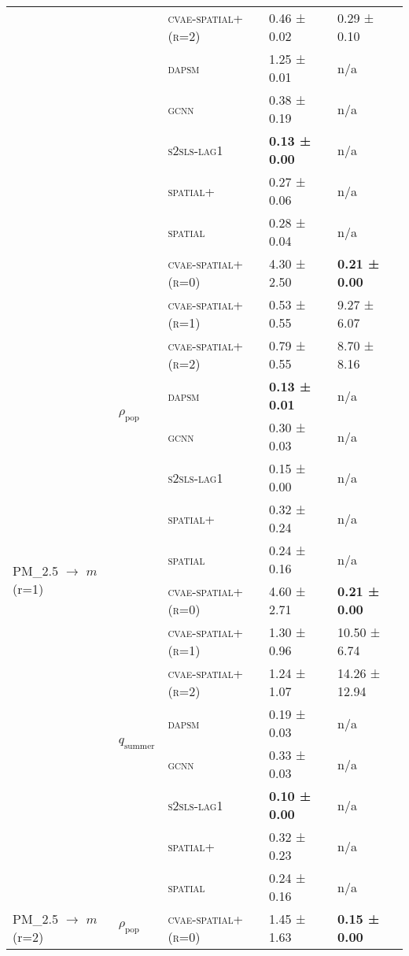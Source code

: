 \documentclass{article}
\begin{document}
\begin{table}[!tbp]
\begin{tabular}{lllll}
 &  & \textsc{cvae-spatial+ (r=2)} & 0.46 ± {\small 0.02} & 0.29 ± {\small 0.10} \\
 &  & \textsc{dapsm} & 1.25 ± {\small 0.01} & n/a \\
 &  & \textsc{gcnn} & 0.38 ± {\small 0.19} & n/a \\
 &  & \textsc{s2sls-lag1} & \bf 0.13 ± {\small 0.00} & n/a \\
 &  & \textsc{spatial+} & 0.27 ± {\small 0.06} & n/a \\
 &  & \textsc{spatial} & 0.28 ± {\small 0.04} & n/a \\
\cline{1-5} \cline{2-5}
\multirow[t]{16}{*}{PM_{2.5} $\to$ $m$ (r=1)} & \multirow[t]{8}{*}{$\rho_{\text{pop}}$} & \textsc{cvae-spatial+ (r=0)} & 4.30 ± {\small 2.50} & \bf 0.21 ± {\small 0.00} \\
 &  & \textsc{cvae-spatial+ (r=1)} & 0.53 ± {\small 0.55} & 9.27 ± {\small 6.07} \\
 &  & \textsc{cvae-spatial+ (r=2)} & 0.79 ± {\small 0.55} & 8.70 ± {\small 8.16} \\
 &  & \textsc{dapsm} & \bf 0.13 ± {\small 0.01} & n/a \\
 &  & \textsc{gcnn} & 0.30 ± {\small 0.03} & n/a \\
 &  & \textsc{s2sls-lag1} & 0.15 ± {\small 0.00} & n/a \\
 &  & \textsc{spatial+} & 0.32 ± {\small 0.24} & n/a \\
 &  & \textsc{spatial} & 0.24 ± {\small 0.16} & n/a \\
\cline{2-5}
 & \multirow[t]{8}{*}{$q_{\text{summer}}$} & \textsc{cvae-spatial+ (r=0)} & 4.60 ± {\small 2.71} & \bf 0.21 ± {\small 0.00} \\
 &  & \textsc{cvae-spatial+ (r=1)} & 1.30 ± {\small 0.96} & 10.50 ± {\small 6.74} \\
 &  & \textsc{cvae-spatial+ (r=2)} & 1.24 ± {\small 1.07} & 14.26 ± {\small 12.94} \\
 &  & \textsc{dapsm} & 0.19 ± {\small 0.03} & n/a \\
 &  & \textsc{gcnn} & 0.33 ± {\small 0.03} & n/a \\
 &  & \textsc{s2sls-lag1} & \bf 0.10 ± {\small 0.00} & n/a \\
 &  & \textsc{spatial+} & 0.32 ± {\small 0.23} & n/a \\
 &  & \textsc{spatial} & 0.24 ± {\small 0.16} & n/a \\
\cline{1-5} \cline{2-5}
\multirow[t]{16}{*}{PM_{2.5} $\to$ $m$ (r=2)} & \multirow[t]{8}{*}{$\rho_{\text{pop}}$} & \textsc{cvae-spatial+ (r=0)} & 1.45 ± {\small 1.63} & \bf 0.15 ± {\small 0.00} \\

\end{tabular}
\end{table}
\end{document}
